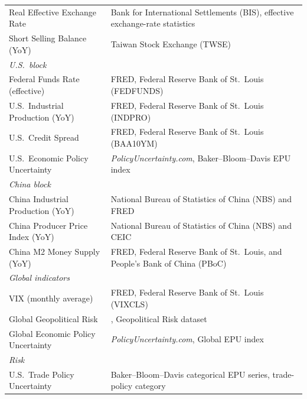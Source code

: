 \begin{center}
\begin{longtable}{p{7.1cm} p{7.1cm}}
Real Effective Exchange Rate & Bank for International Settlements (BIS), effective exchange-rate statistics \\
Short Selling Balance (YoY) & Taiwan Stock Exchange (TWSE) \\
\multicolumn{2}{l}{\textit{U.S.\ block}}\\
Federal Funds Rate (effective) & FRED, Federal Reserve Bank of St.\ Louis (FEDFUNDS) \\
U.S.\ Industrial Production (YoY) & FRED, Federal Reserve Bank of St.\ Louis (INDPRO) \\
U.S.\ Credit Spread & FRED, Federal Reserve Bank of St.\ Louis (BAA10YM) \\
U.S.\ Economic Policy Uncertainty & \textit{PolicyUncertainty.com}, Baker--Bloom--Davis EPU index \\
\multicolumn{2}{l}{\textit{China block}}\\
China Industrial Production (YoY) & National Bureau of Statistics of China (NBS) and FRED \\
China Producer Price Index (YoY) & National Bureau of Statistics of China (NBS) and CEIC \\
China M2 Money Supply (YoY) & FRED, Federal Reserve Bank of St.\ Louis, and People's Bank of China (PBoC) \\
\multicolumn{2}{l}{\textit{Global indicators}}\\
VIX (monthly average) & FRED, Federal Reserve Bank of St.\ Louis (VIXCLS) \\
Global Geopolitical Risk & \citet{caldara2022measuring}, Geopolitical Risk dataset \\
Global Economic Policy Uncertainty & \textit{PolicyUncertainty.com}, Global EPU index \\
\multicolumn{2}{l}{\textit{Risk}}\\
U.S.\ Trade Policy Uncertainty & Baker--Bloom--Davis categorical EPU series, trade-policy category \\
\end{longtable}
\end{center}

